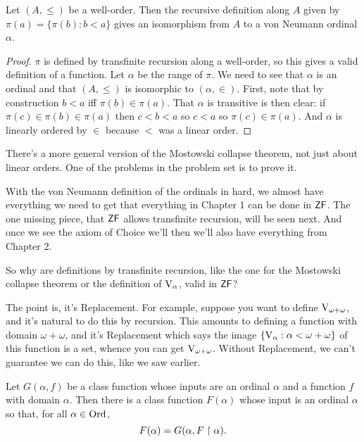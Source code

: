 \documentclass[10pt]{amsart}
\begin{document}
\begin{theorem}
Let $(A,\le)$ be a well-order. Then the recursive definition along $A$ given by $\pi(a) = \{ \pi(b) : b < a \}$ gives an isomorphism from $A$ to a von Neumann ordinal $\alpha$.
\end{theorem}

\begin{proof}
$\pi$ is defined by transfinite recursion along a well-order, so this gives a valid definition of a function. Let $\alpha$ be the range of $\pi$. We need to see that $\alpha$ is an ordinal and that $(A,\le)$ is isomorphic to $(\alpha,\in)$. First, note that by construction $b < a$ iff $\pi(b) \in \pi(a)$. That $\alpha$ is transitive is then clear: if $\pi(c) \in \pi(b) \in \pi(a)$ then $c < b < a$ so $c < a$ so $\pi(c) \in \pi(a)$. And $\alpha$ is linearly ordered by $\in$ because $<$ was a linear order.
\end{proof}

There's a more general version of the Mostowski collapse theorem, not just about linear orders. One of the problems in the problem set is to prove it.
\smallskip

With the von Neumann definition of the ordinals in hard, we almost have everything we need to get that everything in Chapter 1 can be done in $\mathsf{ZF}$. The one missing piece, that $\mathsf{ZF}$ allows transfinite recursion, will be seen next. And once we see the axiom of Choice we'll then we'll also have everything from Chapter 2. 

So why are definitions by transfinite recursion, like the one for the Mostowski collapse theorem or the definition of $\mathrm{V}_\alpha$, valid in $\mathsf{ZF}$?

The point is, it's Replacement. For example, suppose you want to define $\mathrm{V}_{\omega + \omega}$, and it's natural to do this by recursion. This amounts to defining a function with domain $\omega + \omega$, and it's Replacement which says the image $\{ \mathrm{V}_\alpha : \alpha < \omega + \omega \}$ of this function is a set, whence you can get $\mathrm{V}_{\omega + \omega}$. Without Replacement, we can't guarantee we can do this, like we saw earlier.

\begin{theorem}
Let $G(\alpha,f)$ be a class function whose inputs are an ordinal $\alpha$ and a function $f$ with domain $\alpha$. Then there is a class function $F(\alpha)$ whose input is an ordinal $\alpha$ so that, for all $\alpha \in \mathrm{Ord}$,
\[
F(\alpha) = G(\alpha, F \upharpoonright \alpha).
\]
\end{theorem}
\end{document}
